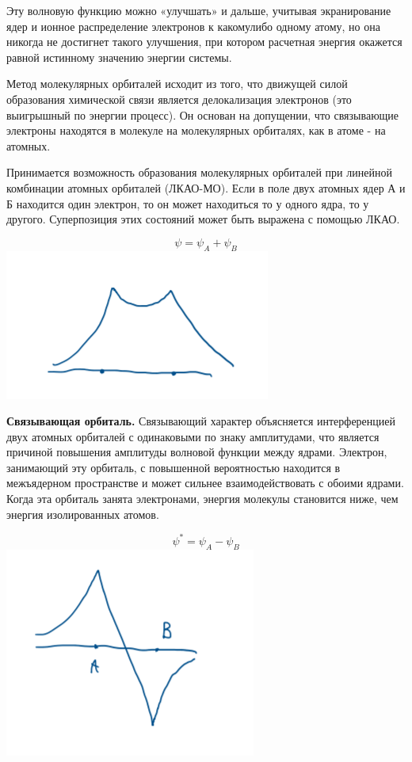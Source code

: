 Эту волновую функцию можно «улучшать» и дальше, учитывая
экранирование ядер и ионное распределение электронов к какомулибо одному атому, но она никогда не достигнет такого улучшения,
при котором расчетная энергия окажется равной истинному
значению энергии системы.

Метод молекулярных орбиталей исходит из того, что движущей
силой образования химической связи является делокализация
электронов (это выигрышный по энергии процесс). Он основан на
допущении, что связывающие электроны находятся в молекуле на
молекулярных орбиталях, как в атоме - на атомных. 

Принимается возможность образования
молекулярных орбиталей при линейной комбинации атомных
орбиталей (ЛКАО-МО). Если в поле двух атомных ядер А и Б
находится один электрон, то он может находиться то у одного ядра,
то у другого. Суперпозиция этих состояний может быть выражена с
помощью ЛКАО.

$$\psi = \psi_A + \psi_B$$
\includegraphics{images/3v1.png}

\textbf{Связывающая орбиталь.} Связывающий характер объясняется интерференцией двух атомных
орбиталей с одинаковыми по знаку амплитудами, что является причиной повышения
амплитуды волновой функции между ядрами. Электрон, занимающий эту орбиталь, с
повышенной вероятностью находится в межъядерном пространстве и может сильнее
взаимодействовать с обоими ядрами. Когда эта орбиталь занята электронами, энергия
молекулы становится ниже, чем энергия изолированных атомов.

$$\psi^* = \psi_A - \psi_B$$
\includegraphics[scale=.750]{images/3v2.png}

